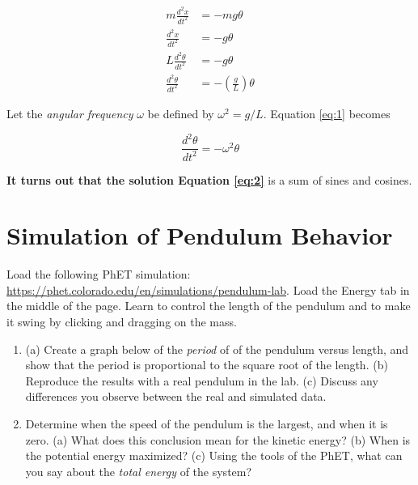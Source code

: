 \documentclass{article}
\begin{document}
\begin{align}
m \frac{d^2 x}{dt^2} &= -mg\theta \\
\frac{d^2 x}{dt^2} &= -g\theta \\
L\frac{d^2 \theta}{dt^2} &= -g\theta \\
\frac{d^2 \theta}{dt^2} &= -\left(\frac{g}{L}\right)\theta \label{eq:1}
\end{align}

Let the \textit{angular frequency} $\omega$ be defined by $\omega^2 = g/L$.  Equation \ref{eq:1} becomes

\begin{equation}
\frac{d^2 \theta}{dt^2} = -\omega^2\theta \label{eq:2}
\end{equation}

\textbf{It turns out that the solution Equation \ref{eq:2}} is a sum of sines and cosines.

\section{Simulation of Pendulum Behavior}

Load the following PhET simulation: \url{https://phet.colorado.edu/en/simulations/pendulum-lab}.  Load the Energy tab in the middle of the page.  Learn to control the length of the pendulum and to make it swing by clicking and dragging on the mass.

\begin{enumerate}
\item (a) Create a graph below of the \textit{period} of of the pendulum versus length, and show that the period is proportional to the square root of the length. (b) Reproduce the results with a real pendulum in the lab. (c) Discuss any differences you observe between the real and simulated data.  \\ \vspace{6cm}
\item Determine when the speed of the pendulum is the largest, and when it is zero.  (a) What does this conclusion mean for the kinetic energy?  (b) When is the potential energy maximized?  (c) Using the tools of the PhET, what can you say about the \textit{total energy} of the system?
\end{enumerate}
\end{document}
